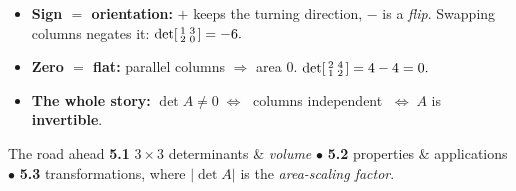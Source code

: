 \documentclass[aspectratio=169, 11pt]{beamer}
\begin{document}
\begin{frame}[t, plain]
  \begin{itemize}
    \setlength{\itemsep}{6pt}
    \item \textbf{Sign $=$ orientation:} $+$ keeps the turning direction, $-$ is a \emph{flip}.
          Swapping columns negates it: $\det\begin{bsmallmatrix} 1 & 3\\ 2 & 0 \end{bsmallmatrix}=-6.$
    \item \textbf{Zero $=$ flat:} parallel columns $\Rightarrow$ area $0$.
          $\det\begin{bsmallmatrix} 2 & 4\\ 1 & 2 \end{bsmallmatrix}=4-4=0.$
    \item \textbf{The whole story:} \; $\det A\ne0 \;\Leftrightarrow\;$ columns independent
          $\;\Leftrightarrow\; A$ is \textbf{invertible}.
  \end{itemize}
  \vspace{2pt}
  \begin{block}{The road ahead}
    \textbf{5.1} $3\times3$ determinants \& \emph{volume} \;$\bullet$\; \textbf{5.2} properties \&
    applications \;$\bullet$\; \textbf{5.3} transformations, where $|\det A|$ is the
    \emph{area-scaling factor}.
  \end{block}
\end{frame}
\end{document}
